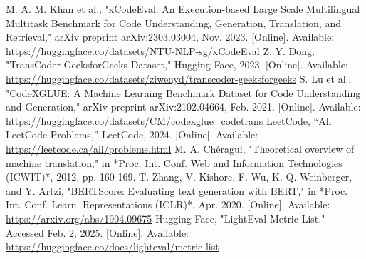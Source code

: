 \documentclass[conference]{IEEEtran}
\begin{document}
\begin{thebibliography}{00}
M. A. M. Khan et al., "xCodeEval: An Execution-based Large Scale Multilingual Multitask Benchmark for Code Understanding, Generation, Translation, and Retrieval," arXiv preprint arXiv:2303.03004, Nov. 2023. [Online]. Available: \url{https://huggingface.co/datasets/NTU-NLP-sg/xCodeEval}
Z. Y. Dong, "TransCoder GeeksforGeeks Dataset," Hugging Face, 2023. [Online]. Available: \url{https://huggingface.co/datasets/ziwenyd/transcoder-geeksforgeeks}
S. Lu et al., "CodeXGLUE: A Machine Learning Benchmark Dataset for Code Understanding and Generation," arXiv preprint arXiv:2102.04664, Feb. 2021. [Online]. Available: \url{https://huggingface.co/datasets/CM/codexglue_codetrans}
LeetCode, “All LeetCode Problems,” LeetCode, 2024. [Online]. Available: \url{https://leetcode.ca/all/problems.html}
M. A. Chéragui, "Theoretical overview of machine translation," in *Proc. Int. Conf. Web and Information Technologies (ICWIT)*, 2012, pp. 160-169.
T. Zhang, V. Kishore, F. Wu, K. Q. Weinberger, and Y. Artzi, 
"BERTScore: Evaluating text generation with BERT," 
in *Proc. Int. Conf. Learn. Representations (ICLR)*, Apr. 2020. 
[Online]. Available: \url{https://arxiv.org/abs/1904.09675}
Hugging Face, "LightEval Metric List," Accessed Feb. 2, 2025. [Online]. Available: \url{https://huggingface.co/docs/lighteval/metric-list}




\end{thebibliography}
\end{document}
